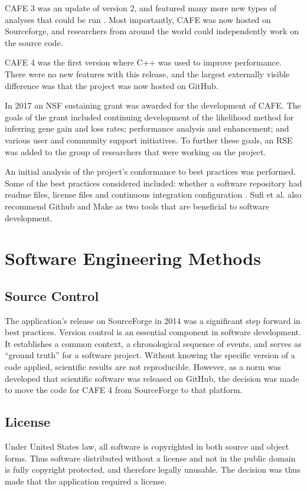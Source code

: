 \documentclass[acmtog, authorversion]{acmart}
\begin{document}
CAFE 3 was an update of version 2, and featured many more new types of analyses that could be run \cite{han2013estimating}. Most importantly, CAFE was now hosted on Sourceforge, and researchers from around the world could independently work on the source code.

CAFE 4 was the first version where C++ was used to improve performance. There were no new features with this release, and the largest externally visible difference was that the project was now hosted on GitHub. 

In 2017 an NSF sustaining grant was awarded for the development of CAFE. The goals of the grant included continuing development of the likelihood method for inferring gene gain and loss rates; performance analysis and enhancement; and various user and community support initiatives. To further these goals, an RSE was added to the group of researchers that were working on the project.

An initial analysis of the project's conformance to best practices was performed. Some of the best practices considered included: whether a software repository had readme files, license files and continuous integration configuration \cite{Sufi2014}. Sufi et al. also recommend Github and Make as two tools that are beneficial to software development.


\section{Software Engineering Methods}

\subsection{Source Control}
The application's release on SourceForge in 2014 was a significant step forward in best practices. Version control is an essential component in software development. It establishes a common context, a chronological sequence of events, and serves as “ground truth” for a software project. Without knowing the specific version of a code applied, scientific results are not reproducible. \cite{Johnson2016} However, as a norm was developed that scientific software was released on GitHub, the decision was made to move the code for CAFE 4 from SourceForge to that platform.

\subsection{License}
Under United States law, all software is copyrighted in both source and object forms. Thus software distributed without a license and not in the public domain is fully copyright protected, and therefore legally unusable. The decision was thus made that the application required a license.
\end{document}
